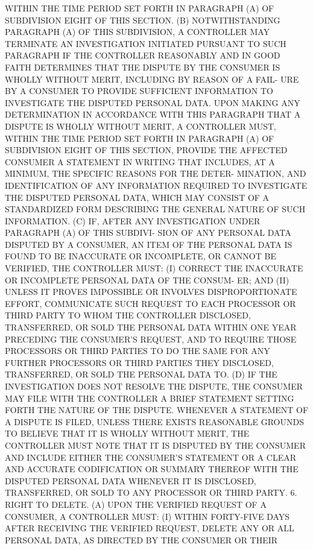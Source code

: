  WITHIN THE TIME PERIOD SET FORTH IN PARAGRAPH (A) OF  SUBDIVISION  EIGHT
 OF THIS SECTION.
   (B)  NOTWITHSTANDING  PARAGRAPH  (A) OF THIS SUBDIVISION, A CONTROLLER
 MAY TERMINATE AN INVESTIGATION INITIATED PURSUANT TO SUCH  PARAGRAPH  IF
 THE  CONTROLLER REASONABLY AND IN GOOD FAITH DETERMINES THAT THE DISPUTE
 BY THE CONSUMER IS WHOLLY WITHOUT MERIT, INCLUDING BY REASON OF A  FAIL-
 URE  BY  A CONSUMER TO PROVIDE SUFFICIENT INFORMATION TO INVESTIGATE THE
 DISPUTED PERSONAL DATA. UPON MAKING ANY DETERMINATION IN ACCORDANCE WITH
 THIS PARAGRAPH THAT A DISPUTE IS  WHOLLY  WITHOUT  MERIT,  A  CONTROLLER
 MUST,  WITHIN  THE TIME PERIOD SET FORTH IN PARAGRAPH (A) OF SUBDIVISION
 EIGHT OF THIS SECTION, PROVIDE THE  AFFECTED  CONSUMER  A  STATEMENT  IN
 WRITING THAT INCLUDES, AT A MINIMUM, THE SPECIFIC REASONS FOR THE DETER-
 MINATION,  AND IDENTIFICATION OF ANY INFORMATION REQUIRED TO INVESTIGATE
 THE DISPUTED PERSONAL DATA, WHICH MAY CONSIST  OF  A  STANDARDIZED  FORM
 DESCRIBING THE GENERAL NATURE OF SUCH INFORMATION.
   (C)  IF,  AFTER ANY INVESTIGATION UNDER PARAGRAPH (A) OF THIS SUBDIVI-
 SION OF ANY PERSONAL DATA  DISPUTED  BY  A  CONSUMER,  AN  ITEM  OF  THE
 PERSONAL  DATA  IS  FOUND  TO  BE INACCURATE OR INCOMPLETE, OR CANNOT BE
 VERIFIED, THE CONTROLLER MUST:
   (I) CORRECT THE INACCURATE OR INCOMPLETE PERSONAL DATA OF THE  CONSUM-
 ER; AND
   (II)  UNLESS IT PROVES IMPOSSIBLE OR INVOLVES DISPROPORTIONATE EFFORT,
 COMMUNICATE SUCH REQUEST TO EACH PROCESSOR OR THIRD PARTY  TO  WHOM  THE
 CONTROLLER  DISCLOSED, TRANSFERRED, OR SOLD THE PERSONAL DATA WITHIN ONE
 YEAR PRECEDING THE CONSUMER'S REQUEST, AND TO REQUIRE  THOSE  PROCESSORS
 OR  THIRD  PARTIES  TO  DO  THE SAME FOR ANY FURTHER PROCESSORS OR THIRD
 PARTIES THEY DISCLOSED, TRANSFERRED, OR SOLD THE PERSONAL DATA TO.
   (D) IF THE INVESTIGATION DOES NOT RESOLVE THE  DISPUTE,  THE  CONSUMER
 MAY  FILE WITH THE CONTROLLER A BRIEF STATEMENT SETTING FORTH THE NATURE
 OF THE DISPUTE. WHENEVER A STATEMENT OF A DISPUTE IS FILED, UNLESS THERE
 EXISTS REASONABLE GROUNDS TO BELIEVE THAT IT IS  WHOLLY  WITHOUT  MERIT,
 THE CONTROLLER MUST NOTE THAT IT IS DISPUTED BY THE CONSUMER AND INCLUDE
 EITHER  THE CONSUMER'S STATEMENT OR A CLEAR AND ACCURATE CODIFICATION OR
 SUMMARY  THEREOF  WITH  THE  DISPUTED  PERSONAL  DATA  WHENEVER  IT   IS
 DISCLOSED, TRANSFERRED, OR SOLD TO ANY PROCESSOR OR THIRD PARTY.
   6.  RIGHT  TO  DELETE.  (A) UPON THE VERIFIED REQUEST OF A CONSUMER, A
 CONTROLLER MUST:
   (I) WITHIN FORTY-FIVE  DAYS  AFTER  RECEIVING  THE  VERIFIED  REQUEST,
 DELETE  ANY  OR  ALL PERSONAL DATA, AS DIRECTED BY THE CONSUMER OR THEIR
